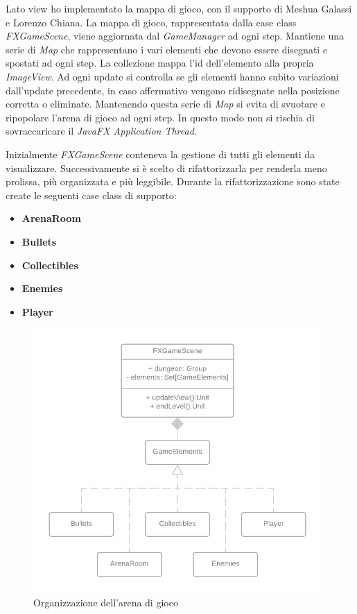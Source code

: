 Lato view ho implementato la mappa di gioco, con il supporto di Meshua Galassi e Lorenzo Chiana. 
La mappa di gioco, rappresentata dalla case class \textit{FXGameScene}, viene aggiornata dal \textit{GameManager} ad ogni step. Mantiene una serie di \textit{Map} che rappresentano i vari elementi che devono essere disegnati e spostati ad ogni step. La collezione mappa l'id dell'elemento alla propria \textit{ImageView}. Ad ogni update si controlla se gli elementi hanno subito variazioni dall'update precedente, in caso affermativo vengono ridisegnate nella posizione corretta o eliminate.
Mantenendo questa serie di \textit{Map} si evita di svuotare e ripopolare l'arena di gioco ad ogni step. In questo modo non si rischia di sovraccaricare il \textit{JavaFX Application Thread}.

Inizialmente \textit{FXGameScene} conteneva la gestione di tutti gli elementi da visualizzare. Successivamente si è scelto di rifattorizzarla per renderla meno prolissa, più organizzata e più leggibile. 
Durante la rifattorizzazione sono state create le seguenti case class di supporto:

\begin{itemize}
    \item \textbf{ArenaRoom}
    \item \textbf{Bullets}
    \item \textbf{Collectibles}
    \item \textbf{Enemies}
    \item \textbf{Player}
\end{itemize}

\begin{figure}[H]
\centering
  \includegraphics[width=11cm]{res/VIEW_Diagram.png}
  \caption{Organizzazione dell'arena di gioco}
  \label{view}
\end{figure}

